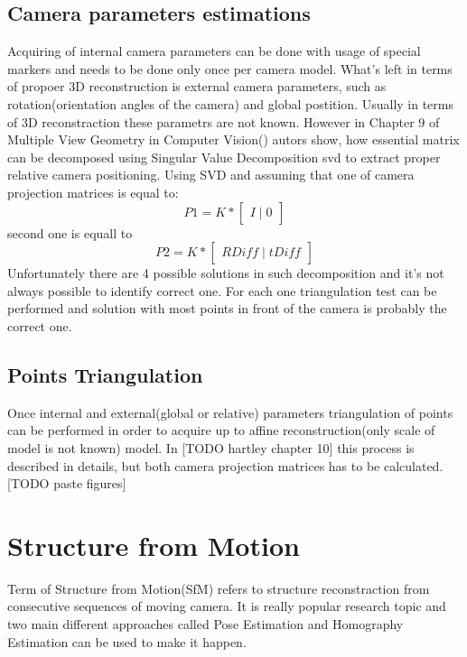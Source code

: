 \subsection{Camera parameters estimations}
Acquiring of internal camera parameters can be done with usage of special markers and needs to be done only once per camera model. What's left in terms of propoer 3D reconstruction is external camera parameters, such as rotation(orientation angles of the camera) and global postition. Usually in terms of 3D reconstraction these parametrs are not known. However in Chapter 9 of Multiple View Geometry in Computer Vision(\cite{HartleyMultipleView})  autors show, how essential matrix can be decomposed using Singular Value Decomposition \gls{svd} to extract proper relative camera positioning. Using SVD and assuming that one of camera projection matrices is equal to:
\begin{equation}
 P1 = K * \begin{bmatrix}I\mid 0\end{bmatrix}
\end{equation}
second one is equall to 
\begin{equation}
 P2 = K * \begin{bmatrix}RDiff\mid tDiff\end{bmatrix}
\end{equation}
Unfortunately there are 4 possible solutions in such decomposition and it's not always possible to identify correct one. For each one triangulation test can be performed and solution with most points in front of the camera is probably the correct one.
\subsection{Points Triangulation}
Once internal and external(global or relative) parameters triangulation of points can be performed in order to acquire up to affine reconstruction(only scale of model is not known) model. In [TODO hartley chapter 10] this process is described in details, but both camera projection matrices has to be calculated.
[TODO paste figures]
\section{Structure from Motion}
Term of Structure from Motion(SfM) refers to structure reconstraction from consecutive sequences of moving camera. It is really popular research topic and two main different approaches called Pose Estimation and Homography Estimation can be used to make it happen.
